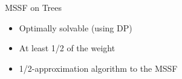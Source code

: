 \begin{frame}{MSSF on Trees}
\begin{itemize}
  \item<1> Optimally solvable (using DP)
  \item<2> At least 1/2 of the weight
  \item<6> 1/2-approximation algorithm to the MSSF 
\end{itemize}
\centering

\end{frame}